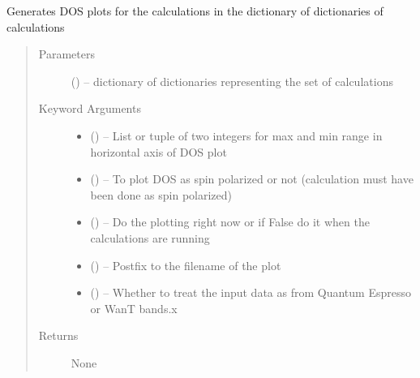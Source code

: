 \documentclass[letterpaper,10pt,english]{sphinxmanual}
\begin{document}

\begin{fulllineitems}
\label{\detokenize{plot:plot.distortionEnergy}}
\end{fulllineitems}


\begin{fulllineitems}
\label{\detokenize{plot:plot.dos}}
Generates DOS plots for the calculations in the dictionary of dictionaries of calculations
\begin{quote}\begin{description}
\item[{Parameters}] \leavevmode
{} () -- dictionary of dictionaries representing the set of calculations

\item[{Keyword Arguments}] \leavevmode\begin{itemize}
\item {} 
 () -- List or tuple of two integers for max and min range in horizontal axis of DOS plot

\item {} 
 () -- To plot DOS as spin polarized or not (calculation must have been done as spin polarized)

\item {} 
 () -- Do the plotting right now or if False do it when the calculations are running

\item {} 
 () -- Postfix to the filename of the plot

\item {} 
 () -- Whether to treat the input data as from Quantum Espresso or WanT bands.x

\end{itemize}

\item[{Returns}] \leavevmode
None

\end{description}\end{quote}

\end{fulllineitems}
\end{document}
